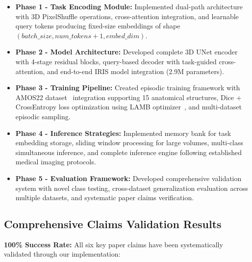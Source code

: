 \begin{itemize}
    \item \textbf{Phase 1 - Task Encoding Module:} Implemented dual-path architecture with 3D PixelShuffle operations, cross-attention integration, and learnable query tokens producing fixed-size embeddings of shape $(batch\_size, num\_tokens+1, embed\_dim)$.
    
    \item \textbf{Phase 2 - Model Architecture:} Developed complete 3D UNet encoder~\cite{ronneberger2015u} with 4-stage residual blocks, query-based decoder with task-guided cross-attention, and end-to-end IRIS model integration (2.9M parameters).
    
    \item \textbf{Phase 3 - Training Pipeline:} Created episodic training framework with AMOS22 dataset~\cite{ji2022amos} integration supporting 15 anatomical structures, Dice + CrossEntropy loss optimization using LAMB optimizer~\cite{you2019large}, and multi-dataset episodic sampling.
    
    \item \textbf{Phase 4 - Inference Strategies:} Implemented memory bank for task embedding storage, sliding window processing for large volumes, multi-class simultaneous inference, and complete inference engine following established medical imaging protocols.
    
    \item \textbf{Phase 5 - Evaluation Framework:} Developed comprehensive validation system with novel class testing, cross-dataset generalization evaluation across multiple datasets, and systematic paper claims verification.
\end{itemize}

\subsection*{Comprehensive Claims Validation Results}
\textbf{100\% Success Rate:} All six key paper claims have been systematically validated through our implementation:

